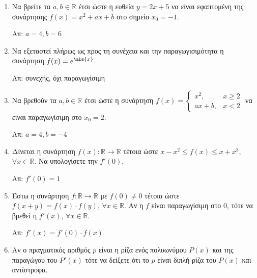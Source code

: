 



\pagestyle{askhseis}




\begin{center}
  \minibox{\large \bfseries \textcolor{Col1}{Ασκήσεις στις Παραγώγους}}
\end{center}

\vspace{\baselineskip}

\begin{enumerate}

  \item Να βρείτε τα $ a, b \in \mathbb{R} $ έτσι ώστε η ευθεία $ y = 2x + 5
    $ να είναι εφαπτομένη της συνάρτησης $ f(x) = x^{2} + ax + b $ στο
    σημείο $ x_{0} = -1 $. 

    \hfill Απ: $ a = 4, b = 6 $

  \item Να εξεταστεί πλήρως ως προς τη συνέχεια και την παραγωγισιμότητα η
    συνάρτηση $ f(x) = e^{\abs{x}} $.

    \hfill Απ: συνεχής, όχι παραγωγίσιμη 

  \item Να βρεθούν τα $ a, b \in \mathbb{R} $ έτσι ώστε η συνάρτηση 
    $
    f(x) = \begin{cases}
      x^{2}, & x\geq 2 \\
      ax+b , & x<2
    \end{cases}
    $
    να είναι παραγωγίσιμη στο $ x_{0} = 2 $.

    \hfill Απ: $ a=4, b=-4 $

  \item Δίνεται η συνάρτηση $ f(x) \colon \mathbb{R} \to \mathbb{R} $ τέτοια
    ώστε $ x - x^{2} \leq f(x) \leq x + x^{3} $, $ \forall x \in \mathbb{R}
    $. Να υπολογίσετε την $ f'(0) $.

    \hfill Απ: $ f'(0) = 1 $

  \item Έστω η συνάρτηση $ f \colon \mathbb{R} \to \mathbb{R} $ με $ f(0)
    \neq 0	$ τέτοια ώστε $ f(x+y) = f(x) \cdot f(y) $, $ \forall x \in
    \mathbb{R} $. Αν η $f$ είναι παραγωγίσιμη στο $0$, τότε να βρεθεί η $
    f'(x) $, $ \forall x \in \mathbb{R} $.

    \hfill Απ: $ f'(x) = f'(0)\cdot f(x) $

  \item Αν ο πραγματικός αριθμός $p$ είναι η ρίζα ενός πολυωνύμου $ P(x)
    $ και της παραγώγου του $ P'(x) $ τότε να δείξετε ότι το $p$ είναι διπλή
    ρίζα του $ P(x) $ και αντίστροφα.


\end{enumerate}
